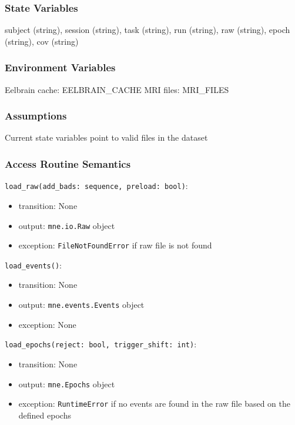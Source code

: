 \documentclass[12pt, titlepage]{article}
\begin{document}
\subsubsection{State Variables}


subject (string), session (string), task (string), run (string), raw (string), epoch (string), cov (string)




\subsubsection{Environment Variables}


Eelbrain cache: EELBRAIN\_CACHE
MRI files: MRI\_FILES




\subsubsection{Assumptions}


Current state variables point to valid files in the dataset




\subsubsection{Access Routine Semantics}


\noindent \lstinline|load_raw(add_bads: sequence, preload: bool)|:
\begin{itemize}
    \item transition: None
    \item output: \lstinline|mne.io.Raw| object
    \item exception: \lstinline|FileNotFoundError| if raw file is not found
\end{itemize}


\noindent \lstinline|load_events()|:
\begin{itemize}
    \item transition: None
    \item output: \lstinline|mne.events.Events| object
    \item exception: None
\end{itemize}


\noindent \lstinline|load_epochs(reject: bool, trigger_shift: int)|:
\begin{itemize}
    \item transition: None
    \item output: \lstinline|mne.Epochs| object
    \item exception: \lstinline|RuntimeError| if no events are found in the raw file based on the defined epochs
\end{itemize}
\end{document}

